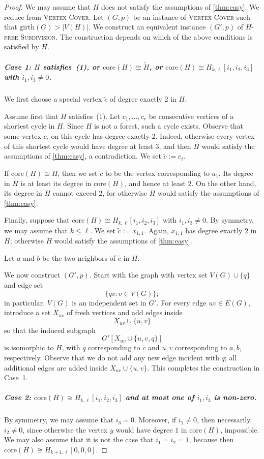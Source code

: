 \documentclass[a4paper,UKenglish,cleveref, autoref, thm-restate]{lipics-v2021}
\newcommand{\girth}{\mathrm{girth}}
\newcommand{\core}{\mathrm{core}}
\newcommand{\tc}{\widetilde{c}}
\begin{document}
\begin{proof}
We may assume that $H$ does not satisfy the assumptions of \cref{thm:easy}.
We reduce from \textsc{Vertex Cover}.
Let $(G,p)$ be an instance of \textsc{Vertex Cover} such that $\girth(G)>|V(H)|$.
We construct an equivalent instance $(G',p)$ of \textsc{$H$-free Subdivision}.
The construction depends on which of the above conditions is satisfied by $H$.

\subparagraph*{Case 1: \boldmath $H$ satisfies~(1), or $\core(H)\cong \widetilde{H}$, or $\core(H)\cong H_{k,\ell}[i_1,i_2,i_3]$ with $i_1,i_3\neq 0$.}
We first choose a special vertex $\tc$ of degree exactly $2$ in $H$.

Assume first that $H$ satisfies~(1).
Let $c_1,\ldots,c_r$ be consecutive vertices of a shortest cycle in $H$.
Since $H$ is not a forest, such a cycle exists.
Observe that some vertex $c_i$ on this cycle has degree exactly $2$.
Indeed, otherwise every vertex of this shortest cycle would have degree at least $3$, and then $H$ would satisfy the assumptions of \cref{thm:easy}, a contradiction.
We set $\tc:=c_i$.

If $\core(H)\cong \widetilde{H}$, then we set $\tc$ to be the vertex corresponding to $a_1$.
Its degree in $H$ is at least its degree in $\core(H)$, and hence at least $2$.
On the other hand, its degree in $H$ cannot exceed $2$, for otherwise $H$ would satisfy the assumptions of \cref{thm:easy}.

Finally, suppose that $\core(H)\cong H_{k,\ell}[i_1,i_2,i_3]$ with $i_1,i_3\neq 0$.
By symmetry, we may assume that $k\leq \ell$.
We set $\tc:=x_{1,1}$.
Again, $x_{1,1}$ has degree exactly $2$ in $H$; otherwise $H$ would satisfy the assumptions of \cref{thm:easy}.

Let $a$ and $b$ be the two neighbors of $\tc$ in $H$.

We now construct $(G',p)$.
Start with the graph with vertex set $V(G)\cup \{q\}$ and edge set
\[
\{qv : v\in V(G)\};
\]
in particular, $V(G)$ is an independent set in $G'$.
For every edge $uv\in E(G)$, introduce a set $X_{uv}$ of fresh vertices and add edges inside
\[
X_{uv}\cup \{u,v\}
\]
so that the induced subgraph
\[
G'[X_{uv}\cup \{u,v,q\}]
\]
is isomorphic to $H$, with $q$ corresponding to $\tc$ and $u,v$ corresponding to $a,b$, respectively.
Observe that we do not add any new edge incident with $q$; all additional edges are added inside $X_{uv}\cup \{u,v\}$.
This completes the construction in Case~1.

\subparagraph*{Case 2: \boldmath $\core(H)\cong H_{k,\ell}[i_1,i_2,i_3]$ and at most one of $i_1,i_3$ is non-zero.}
By symmetry, we may assume that $i_3=0$.
Moreover, if $i_1\neq 0$, then necessarily $i_2\neq 0$, since otherwise the vertex $y$ would have degree $1$ in $\core(H)$, impossible.
We may also assume that it is not the case that $i_1=i_2=1$, because then $\core(H)\cong H_{k+1,\ell}[0,0,0]$.


\end{proof}
\end{document}

